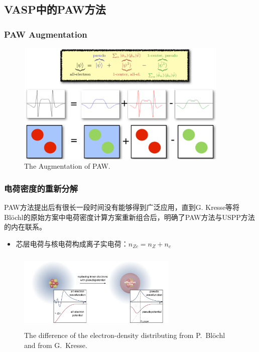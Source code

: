 \subsection{\rm{VASP}中的\rm{PAW}方法}
\frame
{
	\frametitle{\textrm{PAW Augmentation}}
\begin{figure}[h!]
\centering
\includegraphics[height=2.3in,width=4.0in,viewport=0 0 1280 745,clip]{Figures/PAW-baseset.png}
\caption{\tiny \textrm{The Augmentation of PAW.}}%
\label{PAW_baseset}
\end{figure}
}


\frame
{
\frametitle{电荷密度的重新分解}
\textrm{PAW}方法提出后有很长一段时间没有能够得到广泛应用，直到\textrm{G. Kresse}等将\textrm{Bl\"ochl}的原始方案中电荷密度计算方案重新组合后，明确了\textrm{PAW}方法与\textrm{USPP}方法的内在联系。
\begin{itemize}
	\item 芯层电荷与核电荷构成离子实电荷：$n_{Zc}=n_Z+n_c$
\end{itemize}
\begin{figure}[h!]
\centering
\vspace{-10.5pt}
\includegraphics[height=1.5in,width=3.0in,viewport=0 0 380 190,clip]{Figures/Pseudo-potential_charge.png}
\caption{\tiny \textrm{The difference of the electron-density distributing from P.~Bl\"ochl  and from G.~Kresse.}}%
\label{PAW_Pseudo-Charge}
\end{figure}
}

